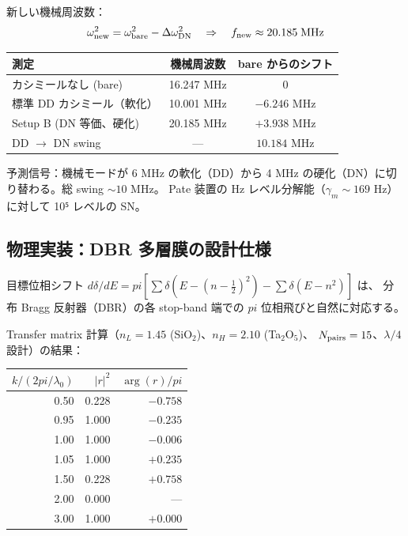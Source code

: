 \documentclass[11pt,a4paper]{article}
\def\pi{pi}%
\def\textbf#1{#1}%
\begin{document}
新しい機械周波数：
\[
  \omega_{\rm new}^2 = \omega_{\rm bare}^2 - \Delta\omega^2_{\rm DN}
  \quad\Rightarrow\quad
  f_{\rm new} \approx 20.185\;\text{MHz}
\]

\begin{center}
\begin{tabular}{lcc}
\toprule
測定 & 機械周波数 & bare からのシフト \\
\midrule
カシミールなし (bare)        & 16.247 MHz & 0 \\
標準 DD カシミール（軟化）   & 10.001 MHz & $-6.246$ MHz \\
\textbf{Setup B (DN 等価、硬化)} & \textbf{20.185 MHz} & \textbf{$+3.938$ MHz} \\
\midrule
\textbf{DD $\to$ DN swing}   & --- & \textbf{$10.184$ MHz} \\
\bottomrule
\end{tabular}
\end{center}

\begin{tcolorbox}[colback=green!5,colframe=green!50!black]
\textbf{予測信号}：機械モードが \textbf{6 MHz の軟化}（DD）から
\textbf{4 MHz の硬化}（DN）に切り替わる。総 swing $\sim 10$ MHz。
Pate 装置の Hz レベル分解能（$\gamma_m \sim 169$ Hz）に対して
\textbf{10⁵ レベルの SN}。
\end{tcolorbox}

\subsection{物理実装：DBR 多層膜の設計仕様}

目標位相シフト $d\delta/dE = \pi[\sum\delta(E-(n-\tfrac12)^2) - \sum\delta(E-n^2)]$ は、
分布 Bragg 反射器（DBR）の各 stop-band 端での $\pi$ 位相飛びと自然に対応する。

Transfer matrix 計算（$n_L = 1.45$ (SiO$_2$)、$n_H = 2.10$ (Ta$_2$O$_5$)、
$N_{\rm pairs}=15$、$\lambda/4$ 設計）の結果：

\begin{center}
\begin{tabular}{rrr}
\toprule
$k/(2\pi/\lambda_0)$ & $|r|^2$ & $\arg(r)/\pi$ \\
\midrule
0.50 & 0.228 & $-0.758$ \\
0.95 & 1.000 & $-0.235$ \\
\textbf{1.00} & \textbf{1.000} & \textbf{$-0.006$} \\
1.05 & 1.000 & $+0.235$ \\
1.50 & 0.228 & $+0.758$ \\
2.00 & 0.000 & --- \\
3.00 & 1.000 & $+0.000$ \\
\bottomrule
\end{tabular}
\end{center}
\end{document}
